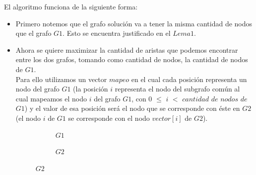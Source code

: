\noindent El algoritmo funciona de la siguiente forma: 
\begin{itemize}
\item Primero notemos que el grafo solución va a tener la misma cantidad de nodos que el grafo $G1$. Esto se encuentra justificado en el $Lema 1$.
\item Ahora se quiere maximizar la cantidad de aristas que podemos encontrar entre los dos grafos, tomando como cantidad de nodos, la cantidad de nodos de $G1$. \\
Para ello utilizamos un vector $mapeo$ en el cual cada posición representa un nodo del grafo $G1$ (la posición $i$ representa el nodo del subgrafo común al cual mapeamos el nodo $i$ del grafo $G1$, con 0 $\leq$ $i$ $<$ $cantidad$ $de$ $nodos$ $de$ $G1$) y el valor de esa posición será el nodo que se corresponde con éste en $G2$ (el nodo $i$ de $G1$ se corresponde con el nodo $vector[i]$ de $G2$).
\begin{figure}[H]
\centering
\begin{subfigure}[h]{0.2\textwidth}
\caption{$G1$}
 \end{subfigure}
\begin{subfigure}[h]{0.2\textwidth}
\caption{$G2$}
\end{subfigure}
\end{figure}


\end{itemize}
